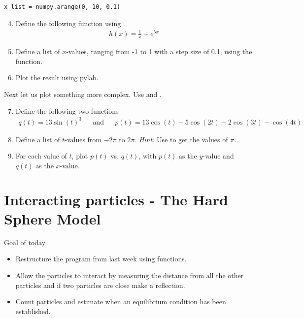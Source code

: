 \documentclass{article}
\begin{document}
\begin{lstlisting}
x_list = numpy.arange(0, 10, 0.1)
\end{lstlisting}

\begin{enumerate}
  \setcounter{enumi}{3}
  \item Define the following function using .
    \begin{align}
        h(x) = \frac{1}{x} + e^{5x}
    \end{align}

  \item Define a list of $x$-values, ranging from -1 to 1 with a step size of 0.1, using the  function.

  \item Plot the result using pylab.

\end{enumerate}

Next let us plot something more complex. Use  and .

\begin{enumerate}
  \setcounter{enumi}{6}
  \item Define the following two functions
    \begin{align}
        q(t) = 13\sin(t)^3 && \text{and} && p(t) = 13\cos(t) - 5 \cos(2t) - 2 \cos(3t) - \cos(4t)
    \end{align}

  \item Define a list of $t$-values from $-2\pi$ to $2\pi$.
      {\em Hint:} Use  to get the values of $\pi$.

  \item For each value of $t$, plot $p(t)$ vs. $q(t)$, with $p(t)$ as the $y$-value and $q(t)$ as the $x$-value.

\end{enumerate}

\newpage
\section{Interacting particles - The Hard Sphere Model}

Goal of today

\begin{itemize}
  \item Restructure the program from last week using functions.
  \item Allow the particles to interact by measuring the distance from all the other particles
    and if two particles are close make a reflection.
  \item Count particles and estimate when an equilibrium condition has been established.
\end{itemize}
\end{document}
